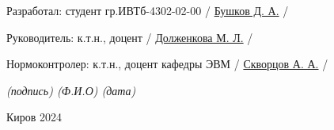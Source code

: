 \begin{titlepage}
	\newcommand{\ulinesize}{2.5cm}

	\large
	\vspace{1cm}
	\noindent
	Разработал: студент гр.ИВТб-4302-02-00 \hfill \uline{\hspace{\ulinesize}}
	/ \uline{Бушков Д. А.} / \hspace{8mm} \uline{\hspace{\ulinesize}}

	\vspace{1.5cm}
	\noindent
	Руководитель: к.т.н., доцент
	\hfill \uline{\hspace{\ulinesize}}
	/ \uline{Долженкова М. Л.} / \uline{\hspace{\ulinesize}}

	\vspace{1.5cm}
	\noindent
	Нормоконтролер: к.т.н., доцент кафедры ЭВМ
	\hfill \uline{\hspace{\ulinesize}}
	/ \uline{Скворцов А. А.} / \hspace{4mm} \uline{\hspace{\ulinesize}}

	{
		\small
		\itshape
		\hfill
		(подпись) \hspace{1.6cm} (Ф.И.О) \hspace{2.2cm} (дата) \hspace{0.8cm}
	}

	\begin{center}
		\vfill
		Киров 2024
		\vspace{1cm}
	\end{center}


\end{titlepage}
